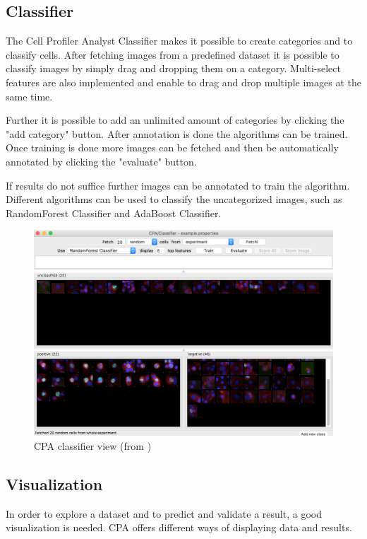 \subsection{Classifier}
The Cell Profiler Analyst Classifier makes it possible to create categories and to classify cells.
 After fetching images from a predefined dataset it is possible to classify images 
 by simply drag and dropping them on a category. Multi-select features are also implemented
  and enable to drag and drop multiple images at the same time. 
  
  Further it is possible to add an unlimited amount of categories by clicking the "add category" button. 
  After annotation is done the algorithms can be trained. Once training is done more images can be 
  fetched and then be automatically annotated by clicking the "evaluate" button. 
  
  If results do not suffice further images can be annotated to train the algorithm. 
  Different algorithms can be used to classify the uncategorized images, such as 
  RandomForest Classifier and AdaBoost Classifier.

\begin{figure}[H]
	\centering
	\includegraphics[width=1.0\linewidth]{bilder/related_work/classifier.png}
	\caption{CPA classifier view (from \cite{Jones2008})}
	\label{fig:Classifier}
\end{figure}


\subsection{Visualization}


In order to explore a dataset and to predict and validate a result, a good visualization is needed. 
CPA offers different ways of displaying data and results. 

